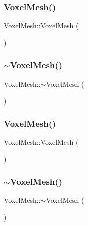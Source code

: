 \subsubsection{\texorpdfstring{VoxelMesh()}{VoxelMesh()}\hspace{0.1cm}{\footnotesize\ttfamily [1/2]}}
{\footnotesize\ttfamily Voxel\+Mesh\+::\+Voxel\+Mesh (\begin{DoxyParamCaption}{ }\end{DoxyParamCaption})}

\mbox{\label{class_voxel_mesh_afc295113483555b4784301a80870a77e}} 
\subsubsection{\texorpdfstring{$\sim$VoxelMesh()}{~VoxelMesh()}\hspace{0.1cm}{\footnotesize\ttfamily [1/2]}}
{\footnotesize\ttfamily Voxel\+Mesh\+::$\sim$\+Voxel\+Mesh (\begin{DoxyParamCaption}{ }\end{DoxyParamCaption})}

\mbox{\label{class_voxel_mesh_a700f305d3ec0fba1230dc648ab638559}} 
\subsubsection{\texorpdfstring{VoxelMesh()}{VoxelMesh()}\hspace{0.1cm}{\footnotesize\ttfamily [2/2]}}
{\footnotesize\ttfamily Voxel\+Mesh\+::\+Voxel\+Mesh (\begin{DoxyParamCaption}{ }\end{DoxyParamCaption})}

\mbox{\label{class_voxel_mesh_afc295113483555b4784301a80870a77e}} 
\subsubsection{\texorpdfstring{$\sim$VoxelMesh()}{~VoxelMesh()}\hspace{0.1cm}{\footnotesize\ttfamily [2/2]}}
{\footnotesize\ttfamily Voxel\+Mesh\+::$\sim$\+Voxel\+Mesh (\begin{DoxyParamCaption}{ }\end{DoxyParamCaption})}



